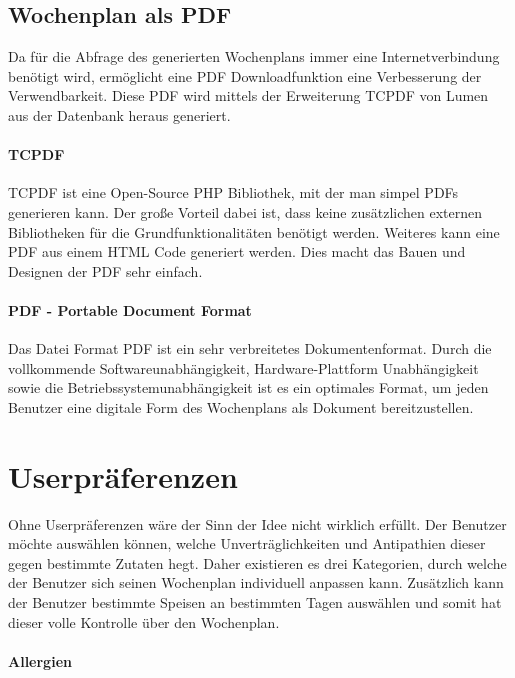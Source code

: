 \subsection{Wochenplan als PDF}

Da für die Abfrage des generierten Wochenplans immer eine Internetverbindung benötigt wird, ermöglicht eine PDF Downloadfunktion eine Verbesserung der Verwendbarkeit. Diese PDF wird mittels der Erweiterung TCPDF von Lumen aus der Datenbank heraus generiert.

\paragraph{TCPDF}

TCPDF\cite{TCPDF} ist eine Open-Source PHP Bibliothek, mit der man simpel PDFs generieren kann. Der große Vorteil dabei ist, dass keine zusätzlichen externen Bibliotheken für die Grundfunktionalitäten benötigt werden. Weiteres kann eine PDF aus einem HTML Code generiert werden. Dies macht das Bauen und Designen der PDF sehr einfach.

\paragraph{PDF - Portable Document Format}

Das Datei Format PDF\cite{PDF} ist ein sehr verbreitetes Dokumentenformat. Durch die vollkommende Softwareunabhängigkeit, Hardware-Plattform Unabhängigkeit sowie die Betriebssystemunabhängigkeit ist es ein optimales Format, um jeden Benutzer eine digitale Form des Wochenplans als Dokument bereitzustellen.

\section{Userpräferenzen}

Ohne Userpräferenzen wäre der Sinn der Idee nicht wirklich erfüllt. Der Benutzer möchte auswählen können, welche Unverträglichkeiten und Antipathien dieser gegen bestimmte Zutaten hegt. Daher existieren es drei Kategorien, durch welche der Benutzer sich seinen Wochenplan individuell anpassen kann. Zusätzlich kann der Benutzer bestimmte Speisen an bestimmten Tagen auswählen und somit hat dieser volle Kontrolle über den Wochenplan.

\paragraph{Allergien}


